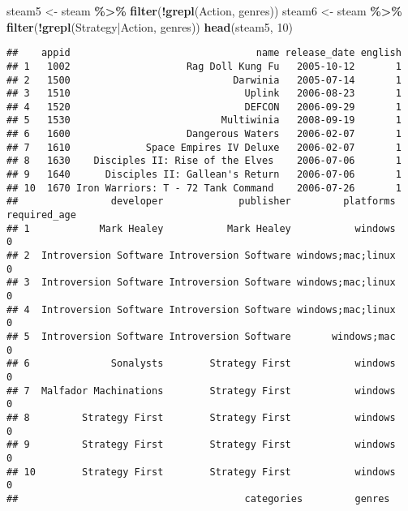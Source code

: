 \documentclass[
]{article}
\newenvironment{Shaded}{\begin{snugshade}}{\end{snugshade}}
\newcommand{\DecValTok}[1]{\textcolor[rgb]{0.00,0.00,0.81}{#1}}
\newcommand{\FunctionTok}[1]{\textcolor[rgb]{0.13,0.29,0.53}{\textbf{#1}}}
\newcommand{\NormalTok}[1]{#1}
\newcommand{\OtherTok}[1]{\textcolor[rgb]{0.56,0.35,0.01}{#1}}
\newcommand{\SpecialCharTok}[1]{\textcolor[rgb]{0.81,0.36,0.00}{\textbf{#1}}}
\newcommand{\StringTok}[1]{\textcolor[rgb]{0.31,0.60,0.02}{#1}}
\begin{document}
\begin{Shaded}
\begin{Highlighting}[]
\NormalTok{steam5 }\OtherTok{\textless{}{-}}\NormalTok{ steam }\SpecialCharTok{\%\textgreater{}\%} \FunctionTok{filter}\NormalTok{(}\SpecialCharTok{!}\FunctionTok{grepl}\NormalTok{(}\StringTok{\textquotesingle{}Action\textquotesingle{}}\NormalTok{, genres))}
\NormalTok{steam6 }\OtherTok{\textless{}{-}}\NormalTok{ steam }\SpecialCharTok{\%\textgreater{}\%} \FunctionTok{filter}\NormalTok{(}\SpecialCharTok{!}\FunctionTok{grepl}\NormalTok{(}\StringTok{\textquotesingle{}Strategy|Action\textquotesingle{}}\NormalTok{, genres))}
\FunctionTok{head}\NormalTok{(steam5, }\DecValTok{10}\NormalTok{)}
\end{Highlighting}
\end{Shaded}

\begin{verbatim}
##    appid                                name release_date english
## 1   1002                    Rag Doll Kung Fu   2005-10-12       1
## 2   1500                            Darwinia   2005-07-14       1
## 3   1510                              Uplink   2006-08-23       1
## 4   1520                              DEFCON   2006-09-29       1
## 5   1530                          Multiwinia   2008-09-19       1
## 6   1600                    Dangerous Waters   2006-02-07       1
## 7   1610             Space Empires IV Deluxe   2006-02-07       1
## 8   1630    Disciples II: Rise of the Elves    2006-07-06       1
## 9   1640      Disciples II: Gallean's Return   2006-07-06       1
## 10  1670 Iron Warriors: T - 72 Tank Command    2006-07-26       1
##                developer             publisher         platforms required_age
## 1            Mark Healey           Mark Healey           windows            0
## 2  Introversion Software Introversion Software windows;mac;linux            0
## 3  Introversion Software Introversion Software windows;mac;linux            0
## 4  Introversion Software Introversion Software windows;mac;linux            0
## 5  Introversion Software Introversion Software       windows;mac            0
## 6              Sonalysts        Strategy First           windows            0
## 7  Malfador Machinations        Strategy First           windows            0
## 8         Strategy First        Strategy First           windows            0
## 9         Strategy First        Strategy First           windows            0
## 10        Strategy First        Strategy First           windows            0
##                                       categories         genres

\end{verbatim}
\end{document}
